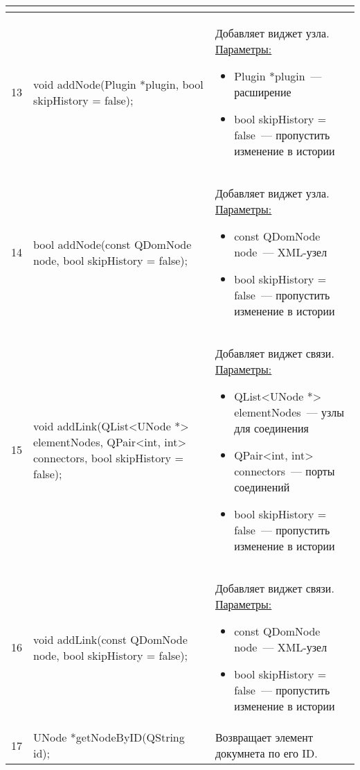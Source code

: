 \begin{longtable}[h]{|p{}|p{}|p{}|}
\begin{itemize}[nolistsep,label=,leftmargin=0cm]
    \end{itemize}\\ \hline
  13 & void addNode(Plugin *plugin,       bool skipHistory = false); & Добавляет виджет узла.\newline
    \uline{Параметры:}
    \begin{itemize}[nolistsep,label=,leftmargin=0cm]
      \item Plugin *plugin~--- расширение
      \item bool skipHistory = false~--- пропустить изменение в истории
    \end{itemize}\\ \hline
  14 & bool addNode(const QDomNode node,  bool skipHistory = false); & Добавляет виджет узла.\newline
    \uline{Параметры:}
    \begin{itemize}[nolistsep,label=,leftmargin=0cm]
      \item const QDomNode node~--- XML-узел
      \item bool skipHistory = false~--- пропустить изменение в истории
    \end{itemize}\\ \hline
  15 & void addLink(QList<UNode *> elementNodes, QPair<int, int> connectors, bool skipHistory = false); & Добавляет виджет связи.\newline
    \uline{Параметры:}
    \begin{itemize}[nolistsep,label=,leftmargin=0cm]
      \item QList<UNode *> elementNodes~--- узлы для соединения
      \item QPair<int, int> connectors~--- порты соединений
      \item bool skipHistory = false~--- пропустить изменение в истории
    \end{itemize}\\ \hline
  16 & void addLink(const QDomNode node,  bool skipHistory = false); & Добавляет виджет связи.\newline
    \uline{Параметры:}
    \begin{itemize}[nolistsep,label=,leftmargin=0cm]
      \item const QDomNode node~--- XML-узел
      \item bool skipHistory = false~--- пропустить изменение в истории
    \end{itemize}\\ \hline
  17 & UNode *getNodeByID(QString id); & Возвращает элемент докумнета по его ID.\newline

\end{longtable}
